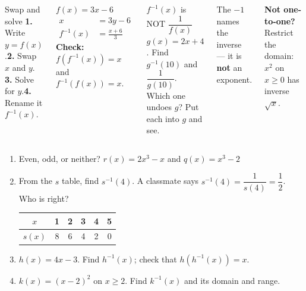 \documentclass[aspectratio=169, 11pt]{beamer}
\begin{document}
\begin{frame}[t, plain]

  \begin{columns}[T]
      \begin{block}{Swap and solve}
        \textbf{1.} Write \(y = f(x)\).\quad \textbf{2.} Swap \(x\) and \(y\).\\[2pt]
        \textbf{3.} Solve for \(y\).\quad \textbf{4.} Rename it \(f^{-1}(x)\).
      \end{block}
      \textbf{\(f(x) = 3x - 6\)}
      \begin{align*}
        x &= 3y - 6 \\
        f^{-1}(x) &= \frac{x + 6}{3}
      \end{align*}
      \textbf{Check:} \(f(f^{-1}(x)) = x\) and \(f^{-1}(f(x)) = x\).

      \begin{block}{\(f^{-1}(x)\) is NOT \(\dfrac{1}{f(x)}\)}
        \(g(x) = 2x + 4\). Find \(g^{-1}(10)\) and \(\dfrac{1}{g(10)}\).\\[3pt]
        Which one undoes \(g\)? Put each into \(g\) and see.
      \end{block}
      The \(-1\) names the inverse --- it is \textbf{not} an exponent.

      \medskip
      \textbf{Not one-to-one?} Restrict the domain: \(x^2\) on \(x \ge 0\) has
      inverse \(\sqrt{x}\).
  \end{columns}
\end{frame}

\begin{frame}[t, plain]

  \begin{enumerate}\setlength{\itemsep}{7pt}
    \setcounter{enumi}{14}
    \item Even, odd, or neither? \(r(x) = 2x^3 - x\) \quad and \quad \(q(x) = x^3 - 2\)
    \item From the \(s\) table, find \(s^{-1}(4)\). A classmate says
          \(s^{-1}(4) = \dfrac{1}{s(4)} = \dfrac{1}{2}\). Who is right?

          \smallskip
          \begin{tabular}{|c|c|c|c|c|c|}
          \hline \(x\) & 1 & 2 & 3 & 4 & 5 \\ \hline \(s(x)\) & 8 & 6 & 4 & 2 & 0 \\ \hline
          \end{tabular}
    \item \(h(x) = 4x - 3\). Find \(h^{-1}(x)\); check that \(h(h^{-1}(x)) = x\).
    \item \(k(x) = (x - 2)^2\) on \(x \ge 2\). Find \(k^{-1}(x)\) and its domain and range.
  \end{enumerate}
\end{frame}
\end{document}
